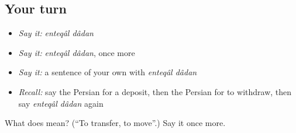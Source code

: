 \subsection*{Your turn}
\begin{itemize}
\raggedright
  \item \emph{Say it:} \emph{enteqâl dâdan}
  \item \emph{Say it:} \emph{enteqâl dâdan}, once more
  \item \emph{Say it:} a sentence of your own with \emph{enteqâl dâdan}
  \item \emph{Recall:} say the Persian for a deposit, then the Persian for to withdraw, then say \emph{enteqâl dâdan} again
\end{itemize}

\begin{tcolorbox}[breakable,colback=teal!4,colframe=teal!35!black,title={Before you move on}]
What does   mean? (\textquotedblleft{}To transfer, to move\textquotedblright{}.) Say it once more.
\end{tcolorbox}
